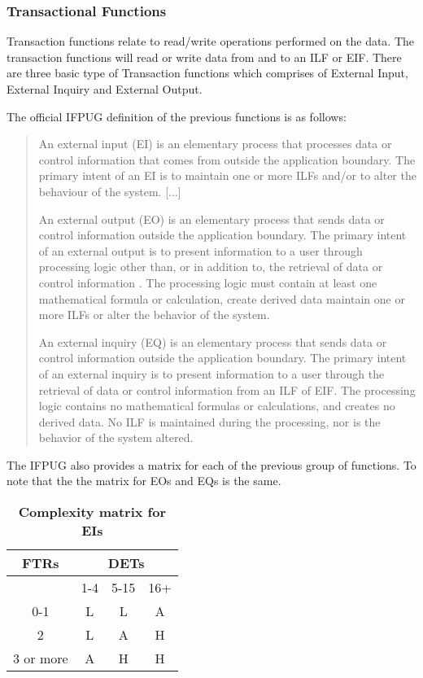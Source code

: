 \subsubsection{Transactional Functions}
Transaction functions relate to read/write operations performed on the data. The transaction functions will read or write data from and to an ILF or EIF. There are three basic type of Transaction functions which comprises of External Input, External Inquiry and External Output.

The official IFPUG definition of the previous functions is as follows:
\begin{quote}
An external input (EI) is an elementary process that processes data or control information that comes from outside the application boundary. The primary intent of an EI is to maintain one or more ILFs and/or to alter the behaviour of the system. [...]

An external output (EO) is an elementary process that sends data or control information outside the application boundary. The primary intent of an external output is to present information to a user through processing logic other than, or in addition to, the retrieval of data or control information . The processing logic must contain at least one mathematical formula or calculation, create derived data maintain one or more ILFs or alter the behavior of the system. 

An external inquiry (EQ) is an elementary process that sends data or control information outside the application boundary. The primary intent of an external inquiry is to present information to a user through the retrieval of data or control information from an ILF of EIF. The processing logic contains no mathematical formulas or calculations, and creates no derived data. No ILF is maintained during the processing, nor is the behavior of the system altered.     
\end{quote}

The IFPUG also provides a matrix for each of the previous group of functions. To note that the the matrix for EOs and EQs is the same.

\begin{longtable}{| c | c | c | c |}
	\caption{\textbf{Complexity matrix for EIs}}
	\label{tab:ei_complexity_matrix}
	\\ \hline
	
	\textbf{FTRs}  & \multicolumn{3}{c|}{\textbf{DETs}} \\ \hline
	   & 1-4  & 5-15  & 16+ \\ \hline
	0-1  & L  & L  & A \\ \hline
	2  & L  & A  & H \\ \hline
	3 or more  & A  & H  & H \\ \hline
\end{longtable}

